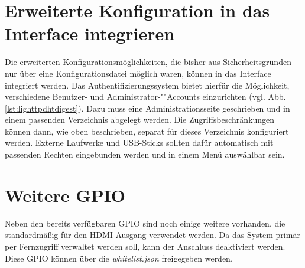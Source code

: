 \section{Erweiterte Konfiguration in das Interface integrieren}
Die erweiterten Konfigurationsmöglichkeiten, die bisher aus Sicherheitsgründen nur über eine Konfigurationsdatei möglich waren, können in das Interface integriert werden. Das Authentifizierungssystem bietet hierfür die Möglichkeit, verschiedene Benutzer- und Ad\-mi\-ni\-stra\-tor-""Accounts einzurichten (vgl. Abb. \ref{lst:lighttpdhtdigest}). Dazu muss eine Administrationsseite geschrieben und in einem passenden Verzeichnis abgelegt werden. Die Zugriffsbeschränkungen können dann, wie oben beschrieben, separat für dieses Verzeichnis konfiguriert werden. Externe Laufwerke und USB-Sticks sollten dafür automatisch mit passenden Rechten eingebunden werden und in einem Menü auswählbar sein.


\section{Weitere GPIO}
Neben den bereits verfügbaren GPIO sind noch einige weitere vorhanden, die standardmäßig für den HDMI-Ausgang verwendet werden. Da das System primär per Fernzugriff verwaltet werden soll, kann der Anschluss deaktiviert werden. Diese GPIO können über die \textit{whitelist.json} freigegeben werden.